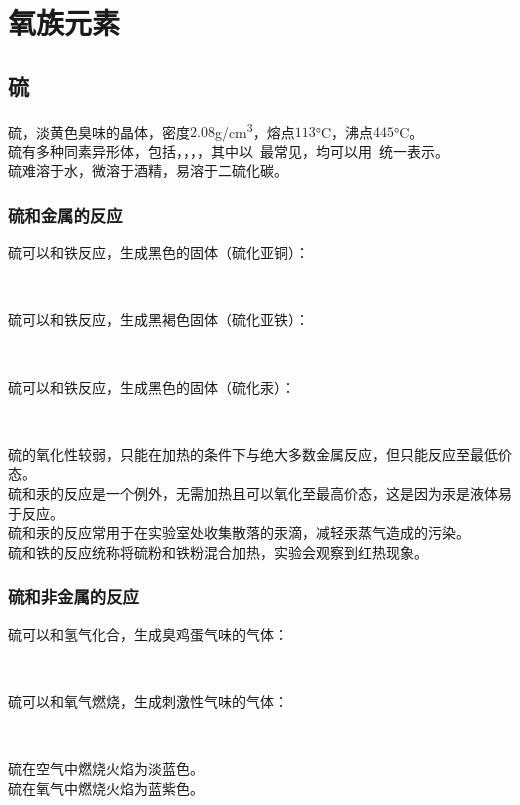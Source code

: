\documentclass[UTF8]{ctexart}
\begin{document}
\newpage

\section{氧族元素}

\subsection{硫}
    硫，淡黄色臭味的晶体，密度$2.08$\si{g/cm^3}，熔点$113$\si{\degreeCelsius}，沸点$445$\si{\degreeCelsius}。\\[3mm]
    硫有多种同素异形体，包括，，，，其中以~最常见，均可以用~统一表示。\\[3mm]
    硫难溶于水，微溶于酒精，易溶于二硫化碳。

\subsubsection{硫和金属的反应}
    硫可以和铁反应，生成黑色的固体（硫化亚铜）：
    \begin{center}
        \\[6mm]
    \end{center}
    硫可以和铁反应，生成黑褐色固体（硫化亚铁）：
    \begin{center}
        \\[6mm]
    \end{center}
    硫可以和铁反应，生成黑色的固体（硫化汞）：
    \begin{center}
        \\[6mm]
    \end{center}
    硫的氧化性较弱，只能在加热的条件下与绝大多数金属反应，但只能反应至最低价态。\\[3mm]
    硫和汞的反应是一个例外，无需加热且可以氧化至最高价态，这是因为汞是液体易于反应。\\[3mm]
    硫和汞的反应常用于在实验室处收集散落的汞滴，减轻汞蒸气造成的污染。\\[3mm]
    硫和铁的反应统称将硫粉和铁粉混合加热，实验会观察到红热现象。

\subsubsection{硫和非金属的反应}
    硫可以和氢气化合，生成臭鸡蛋气味的气体：
    \begin{center}
        \\[6mm]
    \end{center}
    硫可以和氧气燃烧，生成刺激性气味的气体：
    \begin{center}
        \\[6mm]
    \end{center}
    硫在空气中燃烧火焰为淡蓝色。\\[3mm]
    硫在氧气中燃烧火焰为蓝紫色。
\end{document}
